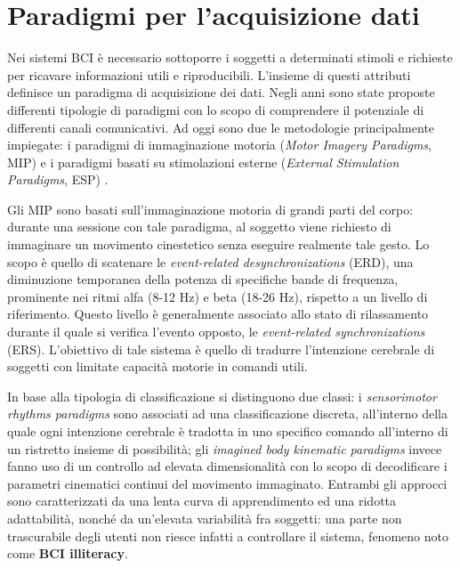 \section{Paradigmi per l’acquisizione dati}
Nei sistemi BCI è necessario sottoporre i soggetti a determinati stimoli e richieste per ricavare informazioni utili e riproducibili. L’insieme di questi attributi definisce un paradigma di acquisizione dei dati. Negli anni sono state proposte differenti tipologie di paradigmi con lo scopo di comprendere il potenziale di differenti canali comunicativi. Ad oggi sono due le metodologie principalmente impiegate: i paradigmi di immaginazione motoria (\emph{Motor Imagery Paradigms}, MIP) e i paradigmi basati su stimolazioni esterne (\emph{External Stimulation Paradigms}, ESP) \cite{abiri2019comprehensive}.

Gli MIP sono basati sull’immaginazione motoria di grandi parti del corpo: durante una sessione con tale paradigma, al soggetto viene richiesto di immaginare un movimento cinestetico senza eseguire realmente tale gesto. Lo scopo è quello di scatenare le \emph{event-related desynchronizations} (ERD), una diminuzione temporanea della potenza di specifiche bande di frequenza, prominente nei ritmi alfa (8-12 Hz) e beta (18-26 Hz), rispetto a un livello di riferimento. Questo livello è generalmente associato allo stato di rilassamento durante il quale si verifica l’evento opposto, le \emph{event-related synchronizations} (ERS). L’obiettivo di tale sistema è quello di tradurre l’intenzione cerebrale di soggetti con limitate capacità motorie in comandi utili. 

In base alla tipologia di classificazione si distinguono due classi: i \emph{sensorimotor rhythms paradigms} sono associati ad una classificazione discreta, all’interno della quale ogni intenzione cerebrale è tradotta in uno specifico comando all’interno di un ristretto insieme di possibilità; gli \emph{imagined body kinematic paradigms} invece fanno uso di un controllo ad elevata dimensionalità con lo scopo di decodificare i parametri cinematici continui del movimento immaginato. Entrambi gli approcci sono caratterizzati da una lenta curva di apprendimento ed una ridotta adattabilità, nonché da un’elevata variabilità fra soggetti: una parte non trascurabile degli utenti non riesce infatti a controllare il sistema, fenomeno noto come \textbf{BCI illiteracy}.

